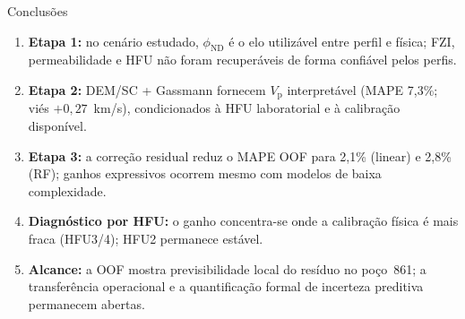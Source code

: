 \documentclass[aspectratio=169,10pt]{beamer}
\newcommand{\phiND}{\ensuremath{\phi_{\mathrm{ND}}}}
\newcommand{\Vp}{\ensuremath{V_{\mathrm{p}}}}
\begin{document}
\begin{frame}{Conclus\~oes}
  \footnotesize
  \begin{enumerate}
    \item \textbf{Etapa 1:} no cen\'ario estudado, \phiND{} \'e o elo
          utiliz\'avel entre perfil e f\'isica; FZI, permeabilidade e HFU
          n\~ao foram recuper\'aveis de forma confi\'avel pelos perfis.
    \item \textbf{Etapa 2:} DEM/SC + Gassmann fornecem \Vp{} interpret\'avel
          (MAPE 7,3\%; vi\'es $+0{,}27$~km/s), condicionados \`a HFU
          laboratorial e \`a calibra\c{c}\~ao dispon\'ivel.
    \item \textbf{Etapa 3:} a corre\c{c}\~ao residual reduz o MAPE OOF para
          2,1\% (linear) e 2,8\% (RF); ganhos expressivos ocorrem mesmo
          com modelos de baixa complexidade.
    \item \textbf{Diagn\'ostico por HFU:} o ganho concentra-se onde a
          calibra\c{c}\~ao f\'isica \'e mais fraca (HFU3/4); HFU2 permanece
          est\'avel.
    \item \textbf{Alcance:} a OOF mostra previsibilidade local do res\'iduo
          no po\c{c}o~861; a transfer\^encia operacional e a quantifica\c{c}\~ao
          formal de incerteza preditiva permanecem abertas.
  \end{enumerate}
\end{frame}
\end{document}
